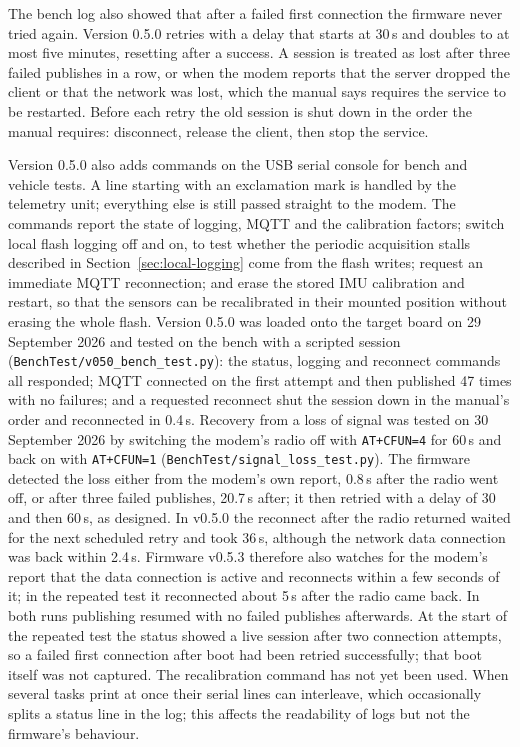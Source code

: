 The bench log also showed that after a failed first connection the firmware never tried again. Version 0.5.0 retries with a delay that starts at 30\,s and doubles to at most five minutes, resetting after a success. A session is treated as lost after three failed publishes in a row, or when the modem reports that the server dropped the client or that the network was lost, which the manual says requires the service to be restarted. Before each retry the old session is shut down in the order the manual requires: disconnect, release the client, then stop the service.

Version 0.5.0 also adds commands on the USB serial console for bench and vehicle tests. A line starting with an exclamation mark is handled by the telemetry unit; everything else is still passed straight to the modem. The commands report the state of logging, MQTT and the calibration factors; switch local flash logging off and on, to test whether the periodic acquisition stalls described in Section~\ref{sec:local-logging} come from the flash writes; request an immediate MQTT reconnection; and erase the stored IMU calibration and restart, so that the sensors can be recalibrated in their mounted position without erasing the whole flash. Version 0.5.0 was loaded onto the target board on 29 September 2026 and tested on the bench with a scripted session (\texttt{BenchTest/v050\_bench\_test.py}): the status, logging and reconnect commands all responded; MQTT connected on the first attempt and then published 47 times with no failures; and a requested reconnect shut the session down in the manual's order and reconnected in 0.4\,s. Recovery from a loss of signal was tested on 30 September 2026 by switching the modem's radio off with \texttt{AT+CFUN=4} for 60\,s and back on with \texttt{AT+CFUN=1} (\texttt{BenchTest/signal\_loss\_test.py}). The firmware detected the loss either from the modem's own report, 0.8\,s after the radio went off, or after three failed publishes, 20.7\,s after; it then retried with a delay of 30 and then 60\,s, as designed. In v0.5.0 the reconnect after the radio returned waited for the next scheduled retry and took 36\,s, although the network data connection was back within 2.4\,s. Firmware v0.5.3 therefore also watches for the modem's report that the data connection is active and reconnects within a few seconds of it; in the repeated test it reconnected about 5\,s after the radio came back. In both runs publishing resumed with no failed publishes afterwards. At the start of the repeated test the status showed a live session after two connection attempts, so a failed first connection after boot had been retried successfully; that boot itself was not captured. The recalibration command has not yet been used. When several tasks print at once their serial lines can interleave, which occasionally splits a status line in the log; this affects the readability of logs but not the firmware's behaviour.
